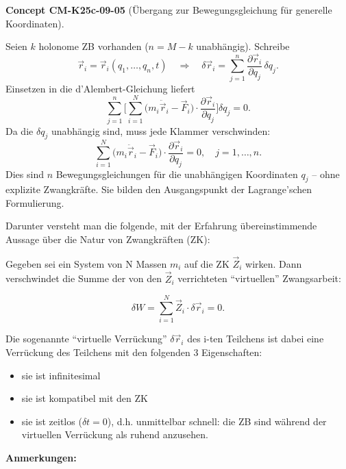 \documentclass[10pt, letterpaper]{article}
\newcommand{\CustomHeading}[3]{%
  \par\medskip\noindent%
  \textbf{#1 #2} \textnormal{(#3)}.\enskip%
}
\newenvironment{CONC}[2]{\begin{unitbox}\CustomHeading{Concept}{#1}{#2}}{\end{unitbox}}
\begin{document}

\begin{CONC}{CM-K25c-09-05}{Übergang zur Bewegungsgleichung für generelle Koordinaten}
Seien $k$ holonome ZB vorhanden ($n=M-k$ unabhängig).  
Schreibe
\[
  \vec r_i = \vec r_i(q_1,\dots,q_n,t)
  \quad\Longrightarrow\quad
  \delta\vec r_i = \sum_{j=1}^{n}
                   \frac{\partial\vec r_i}{\partial q_j}\,\delta q_j .
\]
Einsetzen in die d’Alembert-Gleichung liefert
\[
  \sum_{j=1}^{n}\!
  \Biggl[
    \sum_{i=1}^{N}
      \bigl(m_i\ddot{\vec r}_i - \vec F_i\bigr)
      \!\cdot\!
      \frac{\partial\vec r_i}{\partial q_j}
  \Biggr]\!
  \delta q_j = 0 .
\]
Da die $\delta q_j$ unabhängig sind, muss jede Klammer verschwinden:
\[
  \boxed{\;
    \sum_{i=1}^{N}\!
      \bigl(m_i\ddot{\vec r}_i - \vec F_i\bigr)
      \!\cdot\!
      \frac{\partial\vec r_i}{\partial q_j}
    = 0,
    \quad j=1,\dots,n.
  \;}
\]
Dies sind $n$ Bewegungsgleichungen für die unabhängigen Koordinaten 
$q_j$ – ohne explizite Zwangkräfte. Sie bilden den Ausgangspunkt der Lagrange’schen Formulierung.
\end{CONC}







Darunter versteht man die folgende, mit der Erfahrung übereinstimmende Aussage über die Natur von Zwangkräften (ZK):

Gegeben sei ein System von N Massen $m_i$ auf die ZK $\vec{Z}_i$ wirken. Dann verschwindet die Summe der von den $\vec{Z}_i$ verrichteten ``virtuellen'' Zwangsarbeit:

\[
\delta W = \sum_{i=1}^N \vec{Z}_i \cdot \delta\vec{r}_i = 0.
\]

Die sogenannte ``virtuelle Verrückung'' $\delta\vec{r}_i$ des i-ten Teilchens ist dabei eine Verrückung des Teilchens mit den folgenden 3 Eigenschaften:
\begin{itemize}
\item sie ist infinitesimal
\item sie ist kompatibel mit den ZK
\item sie ist zeitlos ($\delta t=0$), d.h. unmittelbar schnell: die ZB sind während der virtuellen Verrückung als ruhend anzusehen.
\end{itemize}

\textbf{Anmerkungen:}
\end{document}
